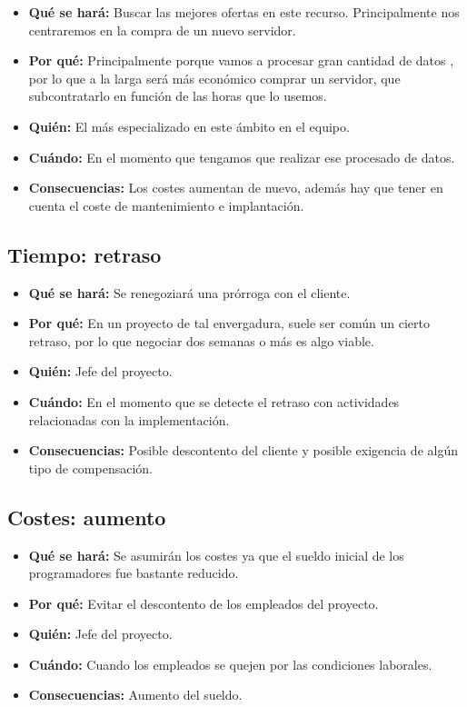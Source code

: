 \begin{itemize}
	\item \textbf{Qué se hará: } Buscar las mejores ofertas en este recurso. Principalmente nos centraremos en la compra de un nuevo servidor.
	\item \textbf{Por qué: } Principalmente porque vamos a procesar gran cantidad de datos , por lo que a la larga será más económico comprar un servidor, que subcontratarlo en función de las horas que lo usemos.
	\item \textbf{Quién: } El más especializado en este ámbito en el equipo.
	\item \textbf{Cuándo: } En el momento que tengamos que realizar ese procesado de datos.
	\item \textbf{Consecuencias: } Los costes aumentan de nuevo, además hay que tener en cuenta el coste de mantenimiento e implantación.
\end{itemize}

\subsection{Tiempo: retraso}

\begin{itemize}
	\item \textbf{Qué se hará: } Se renegoziará una prórroga con el cliente.
	\item \textbf{Por qué: } En un proyecto de tal envergadura, suele ser común un cierto retraso, por lo que negociar dos semanas o más es algo viable.
	\item \textbf{Quién: } Jefe del proyecto.
	\item \textbf{Cuándo: } En el momento que se detecte el retraso con actividades relacionadas con la implementación.
	\item \textbf{Consecuencias: } Posible descontento del cliente y posible exigencia de algún tipo de compensación.
\end{itemize}

\subsection{Costes: aumento}

\begin{itemize}
	\item \textbf{Qué se hará: } Se asumirán los costes ya que el sueldo inicial de los programadores fue bastante reducido.
	\item \textbf{Por qué: } Evitar el descontento de los empleados del proyecto.
	\item \textbf{Quién: } Jefe del proyecto.
	\item \textbf{Cuándo: } Cuando los empleados se quejen por las condiciones laborales.
	\item \textbf{Consecuencias: } Aumento del sueldo.
\end{itemize}

